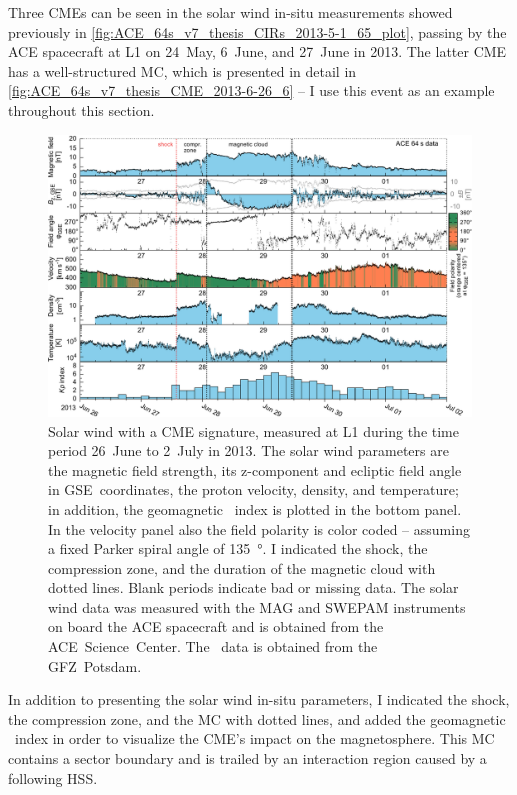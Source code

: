 Three CMEs can be seen in the solar wind in-situ measurements showed previously in \autoref{fig:ACE_64s_v7_thesis_CIRs_2013-5-1_65_plot}, passing by the ACE spacecraft at L1 on 24~May, 6~June, and 27~June in 2013. The latter CME has a well-structured MC, which is presented in detail in \autoref{fig:ACE_64s_v7_thesis_CME_2013-6-26_6} -- I use this event as an example throughout this section.
\begin{figure}[p]
	\centering
	\includegraphics[width=\textwidth]{figures_of_mine/gnuplots/ACE_64s_v7_thesis_CME_2013-6-26_6.pdf}
	\caption[I created the figure myself.]
	{Solar wind with a CME signature, measured at L1 during the time period 26~June to 2~July in 2013. The solar wind parameters are the magnetic field strength, its z-component and ecliptic field angle in GSE~coordinates, the proton velocity, density, and temperature; in addition, the geomagnetic \Kp~index is plotted in the bottom panel. In the velocity panel also the field polarity is color coded -- assuming a fixed Parker spiral angle of \SI{135}{\degree}. I indicated the shock, the compression zone, and the duration of the magnetic cloud with dotted lines. Blank periods indicate bad or missing data. The solar wind data was measured with the MAG and SWEPAM instruments on board the ACE spacecraft and is obtained from the ACE~Science~Center. The \Kp{}~data is obtained from the GFZ~Potsdam.}
	\label{fig:ACE_64s_v7_thesis_CME_2013-6-26_6}
\end{figure}
In addition to presenting the solar wind in-situ parameters, I indicated the shock, the compression zone, and the MC with dotted lines, and added the geomagnetic \Kp{}~index in order to visualize the CME's impact on the magnetosphere. This MC contains a sector boundary and is trailed by an interaction region caused by a following HSS.

